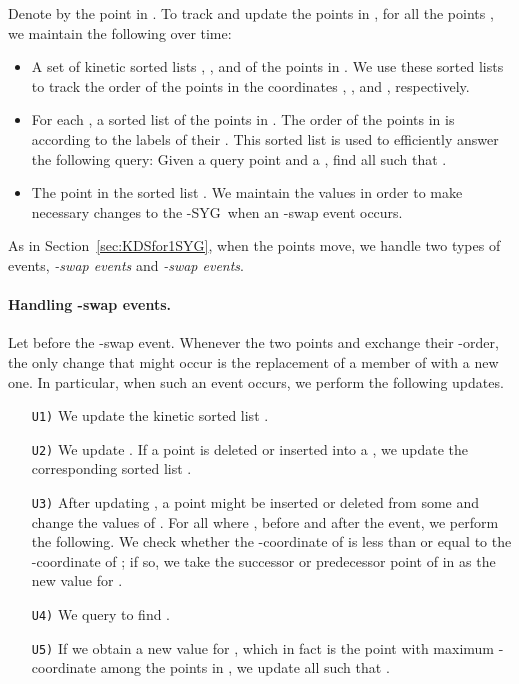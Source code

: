 \documentclass[preprint,12pt]{elsarticle}
\def\ksyg{\mbox{-SYG}}
\begin{document}
Denote by  the  point in .  To track and update the points in , for all the points , we maintain the following over time:

\begin{itemize}
\item A set of  kinetic sorted lists , , and  of the points in . We use these sorted lists to track the order of the points in the coordinates , , and , respectively.
\item For each , a sorted list  of the points in . The order of the points  in  is according to the labels of their . This sorted list  is used to efficiently answer the following query: Given a query point  and a , find all  such that .
\item The  point  in the sorted list . We maintain the values  in order to make necessary changes to the \ksyg~when an -swap event occurs.
\end{itemize}

As in Section~\ref{sec:KDSfor1SYG}, when the points move, we handle two types of events, \textit{-swap events} and \textit{-swap events}.

\paragraph{Handling -swap events.}
Let  before the -swap event. Whenever the two points  and  exchange their -order, the only change that might occur is the replacement of a member of  with a new one. In particular, when such an event occurs, we perform the following updates.

\begin{enumerate}
\item[\texttt{U1)}] We update the kinetic sorted list .
\item[\texttt{U2)}] We update  . If a point is deleted or inserted into a , we update the corresponding sorted list .
\item[\texttt{U3)}] After updating , a point  might be inserted or deleted from some  and change the values of . For all  where , before and after the event, we perform the following. We check whether the -coordinate of   is less than or equal to the -coordinate of ; if so, we take the successor or predecessor point of  in  as the new value for .
\item[\texttt{U4)}] We query to find .
\item[\texttt{U5)}] If we obtain a new value for , which in fact is the point with maximum -coordinate among the points in , we update all  such that .
\end{enumerate}
\end{document}
